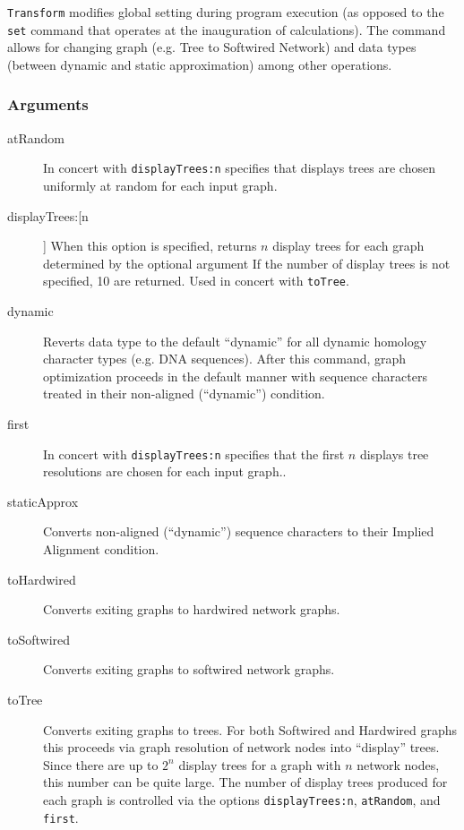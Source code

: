 	\begin{phygdescription}
		{\texttt{Transform} modifies global setting during program execution (as opposed to the \texttt{set} 
		command that operates at the inauguration of calculations). The command allows for changing 
		graph (e.g. Tree to Softwired Network) and data types (between dynamic and static approximation) 
		among other operations.}
	\end{phygdescription}
			
	\subsubsection{Arguments}
		\begin{description}
			\item[atRandom] In concert with \texttt{displayTrees:n} specifies that displays trees are chosen 
			uniformly at random for each input graph.
			
			\item[displayTrees:[n]] When this option is specified, returns $n$ display trees for each graph 
			determined by the optional argument If the number of display trees is not 
			specified, 10 are returned. Used in concert with \texttt{toTree}.
			
			\item[dynamic] Reverts data type to the default ``dynamic'' for all dynamic homology 
			\citep{Wheeler2001} character types (e.g. DNA sequences). After this command, 
			graph optimization proceeds in the default manner with sequence characters treated 
			in their non-aligned (``dynamic'') condition.
			
			\item[first] In concert with \texttt{displayTrees:n} specifies that the first $n$ displays tree 
			resolutions are chosen for each input graph..
			
			\item[staticApprox] Converts non-aligned (``dynamic'') sequence characters to their Implied 
			Alignment \citep{Wheeler2003, WashburnandWheeler2020} condition.
			
			\item[toHardwired] Converts exiting graphs to hardwired network graphs.
			
			\item[toSoftwired] Converts exiting graphs to softwired network graphs.
			
			\item[toTree] Converts exiting graphs to trees. For both Softwired and Hardwired graphs 
			this proceeds via graph resolution of network nodes into ``display'' trees. Since there are up to 
			$2^n$ display trees for a graph with $n$ network nodes, this number can be quite large. 
			The number of display trees produced for each graph is controlled via the options 
			\texttt{displayTrees:n}, \texttt{atRandom}, and \texttt{first}. 
		\end{description}
			
